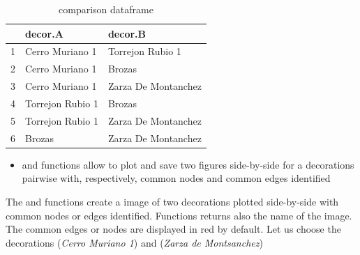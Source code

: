 \documentclass[article]{jss}\usepackage{knitr}
\begin{document}
\begin{table}[H]
\centering
\begin{tabular}{rll}
  \hline
 & decor.A & decor.B \\ 
  \hline
1 & Cerro Muriano 1 & Torrejon Rubio 1 \\ 
  2 & Cerro Muriano 1 & Brozas \\ 
  3 & Cerro Muriano 1 & Zarza De Montanchez \\ 
  4 & Torrejon Rubio 1 & Brozas \\ 
  5 & Torrejon Rubio 1 & Zarza De Montanchez \\ 
  6 & Brozas & Zarza De Montanchez \\ 
   \hline
\end{tabular}
\caption{comparison dataframe} 
\label{Test_table_1}
\end{table}


\begin{itemize} 
\setlength\itemsep{.1em}
  \item {} and  functions allow to plot and save two figures side-by-side for a decorations pairwise with, respectively, common nodes and common edges identified
\end{itemize}

The and  functions create a  image of two decorations plotted side-by-side with common nodes or edges identified. Functions returns also the name of the image. The common edges or nodes are displayed in red by default. Let us choose the decorations  (\emph{Cerro Muriano 1}) and  (\emph{Zarza de Montsanchez})
\end{document}
